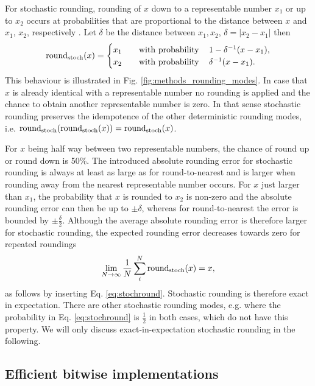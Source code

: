 For stochastic rounding, rounding of $x$ down to a representable number $x_1$ or up to $x_2$ occurs at probabilities
that are proportional to the distance between $x$ and $x_1$, $x_2$, respectively
\citep{Hohfeld1992,Muller2015,Gupta2015,Mikaitis2020,Croci2020}. Let $\delta$ be the distance between
$x_1,x_2$, $\delta = \vert x_2 - x_1 \vert$ then
\begin{equation}
\operatorname{round}_{\operatorname{stoch}}(x) =
\begin{cases}
x_1 \quad &\operatorname{with~probability}\quad 1 - \delta^{-1}(x - x_1),  \\
x_2 &\operatorname{with~probability}\quad  \delta^{-1}(x - x_1).
\end{cases}
\label{eq:stochround}
\end{equation}
This behaviour is illustrated in Fig. \ref{fig:methods_rounding_modes}. In case that $x$ is already identical with a
representable number no rounding is applied and the chance to obtain another representable number is zero.
In that sense stochastic rounding preserves the idempotence of the other deterministic rounding modes, i.e.
$\operatorname{round}_{\operatorname{stoch}}(\operatorname{round}_{\operatorname{stoch}}(x)) = \operatorname{round}_{\operatorname{stoch}}(x)$.

For $x$ being half way between two representable numbers, the chance of round up or round down is 50\%.
The introduced absolute rounding error for stochastic rounding is always at least as large as for round-to-nearest
and is larger when rounding away from the nearest representable number occurs. For $x$ just larger than $x_1$,
the probability that $x$ is rounded to $x_2$ is non-zero and the absolute rounding error can then be up to
$\pm \delta$, whereas for round-to-nearest the error is bounded by $\pm \tfrac{\delta}{2}$.  Although the average
absolute rounding error is therefore larger for stochastic rounding, the expected rounding error
decreases towards zero for repeated roundings
\begin{equation}
\lim_{N\to \infty}\frac{1}{N} \sum_i^N \operatorname{round}_{\operatorname{stoch}}(x) = x,
\end{equation}
as follows by inserting Eq. \ref{eq:stochround}. Stochastic rounding is therefore exact in expectation. There are
other stochastic rounding modes, e.g. where the probability in Eq. \ref{eq:stochround} is $\tfrac{1}{2}$ in both
cases, which do not have this property. We will only discuss exact-in-expectation stochastic rounding in the
following.

\subsection{Efficient bitwise implementations}
\label{sec:bitwiseop}

